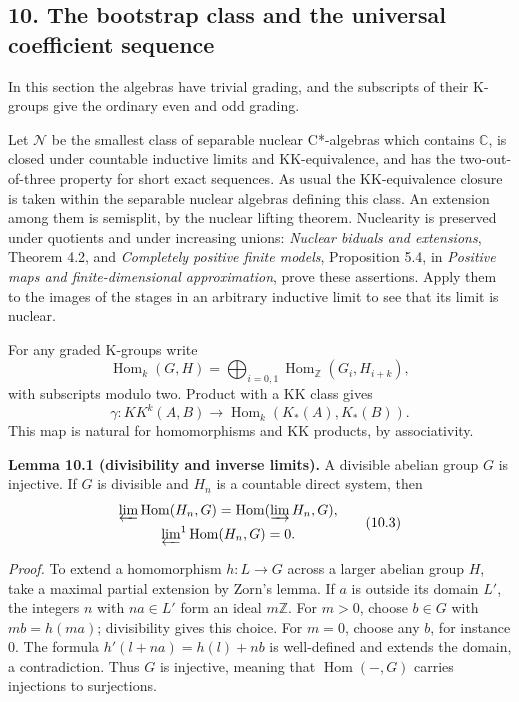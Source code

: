 \documentclass[
  11pt,
]{article}
\begin{document}
\subsection{10. The bootstrap class and the universal coefficient
sequence}\label{the-bootstrap-class-and-the-universal-coefficient-sequence}

In this section the algebras have trivial grading, and the subscripts of
their K-groups give the ordinary even and odd grading.

Let \(\mathcal N\) be the smallest class of separable nuclear
C*-algebras which contains \(\mathbb C\), is closed under countable
inductive limits and KK-equivalence, and has the two-out-of-three
property for short exact sequences. As usual the KK-equivalence closure
is taken within the separable nuclear algebras defining this class. An
extension among them is semisplit, by the nuclear lifting theorem.
Nuclearity is preserved under quotients and under increasing unions:
\emph{Nuclear biduals and extensions}, Theorem 4.2, and \emph{Completely
positive finite models}, Proposition 5.4, in \emph{Positive maps and
finite-dimensional approximation}, prove these assertions. Apply them to
the images of the stages in an arbitrary inductive limit to see that its
limit is nuclear.

For any graded K-groups write \[
\operatorname{Hom}_k(G,H)
=\bigoplus_{i=0,1}\operatorname{Hom}_{\mathbb Z}(G_i,H_{i+k}),
\tag{10.1}
\] with subscripts modulo two. Product with a KK class gives \[
\gamma:KK^k(A,B)\longrightarrow
\operatorname{Hom}_k(K_*(A),K_*(B)).
\tag{10.2}
\] This map is natural for homomorphisms and KK products, by
associativity.

\textbf{Lemma 10.1 (divisibility and inverse limits).} A divisible
abelian group \(G\) is injective. If \(G\) is divisible and \(H_n\) is a
countable direct system, then \[
\begin{gathered}
\varprojlim \operatorname{Hom}(H_n,G)
=\operatorname{Hom}(\varinjlim H_n,G),\\
\varprojlim\nolimits^1\operatorname{Hom}(H_n,G)=0.
\end{gathered}
\tag{10.3}
\]

\emph{Proof.} To extend a homomorphism \(h:L\to G\) across a larger
abelian group \(H\), take a maximal partial extension by Zorn's lemma.
If \(a\) is outside its domain \(L'\), the integers \(n\) with
\(na\in L'\) form an ideal \(m\mathbb Z\). For \(m>0\), choose
\(b\in G\) with \(mb=h(ma)\); divisibility gives this choice. For
\(m=0\), choose any \(b\), for instance 0. The formula
\(h'(l+na)=h(l)+nb\) is well-defined and extends the domain, a
contradiction. Thus \(G\) is injective, meaning that
\(\operatorname{Hom}(-,G)\) carries injections to surjections.
\end{document}
